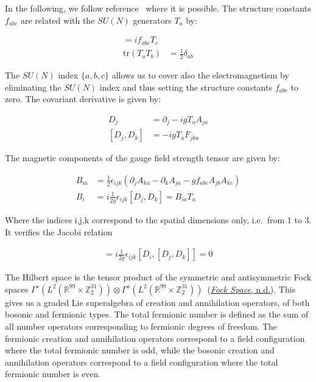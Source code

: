 \documentclass[11pt]{book}
\begin{document}
In the following, we follow
reference~\cite{Van2005Aspects}
where it is possible. The structure constants \(f_{a b c}\) are related
with the \(SU(N)\) generators \(T_{a}\) by:

\begin{equation}\begin{aligned}
=i f_{a b c} T_{c}\\
    \mathrm{tr}(T_a T_b)&=\frac{1}{2}\delta_{a b}\end{aligned}\end{equation}

The \(SU(N)\) index \(\{a,b,c\}\) allows us to cover also the
electromagnetism by eliminating the \(SU(N)\) index and thus setting the
structure constants \(f_{a b c}\) to zero. The covariant derivative is
given by:

\begin{equation}\begin{aligned}
    D_{j}&=\partial_{j} -i g T_a A_{j a}\\
    [D_j,D_k]&=-ig T_a F_{j k a}\end{aligned}\end{equation}

The magnetic components of the gauge field strength tensor are given by:

\begin{equation}\begin{aligned}
    B_{i a}&=\frac{1}{2}\epsilon_{i j k} (\partial_j A_{k a}-\partial_k A_{j a}-g f_{a b c} A_{j b} A_{k c})\\
    B_{i}&=i\frac{1}{2 g}\epsilon_{i j k} [D_j, D_k]=B_{i a} T_a\end{aligned}\end{equation}

Where the indices i,j,k correspond to the spatial dimensions only,
i.e.~from 1 to 3. It verifies the Jacobi relation

\begin{equation}\begin{aligned}
=i\frac{1}{2 g}\epsilon_{i j k}[D_i,[D_j, D_k]]=0\end{aligned}\end{equation}

The Hilbert space is the tensor product of the symmetric and
antisymmetric Fock spaces
\(\Gamma^s(L^2(\mathbb{R}^{99}\times \mathbb{Z}_2^{31}))\otimes \Gamma^a(L^2(\mathbb{R}^{99}\times\mathbb{Z}_2^{31})) \)~\cite{Petz:1990gb}(\protect\hyperlink{ref-Fock}{\emph{Fock Space}, n.d.}). This
gives us a graded Lie superalgebra of creation and annihilation
operators, of both bosonic and fermionic types. The total fermionic
number is defined as the sum of all number operators corresponding to
fermionic degrees of freedom. The fermionic creation and annihilation
operators correspond to a field configuration where the total fermionic
number is odd, while the bosonic creation and annihilation operators
correspond to a field configuration where the total fermionic number is
even.
\end{document}
